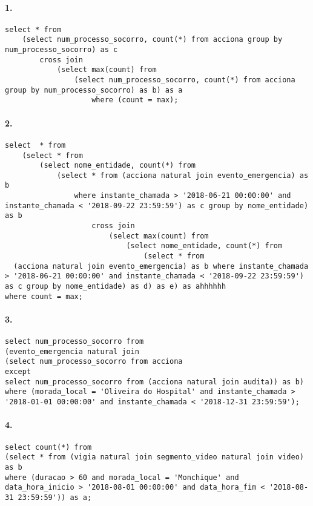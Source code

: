 \documentclass[12pt,a4paper]{article}
\begin{document}
\paragraph{1.}
\begin{verbatim}
select * from 
    (select num_processo_socorro, count(*) from acciona group by num_processo_socorro) as c 
        cross join 
            (select max(count) from 
                (select num_processo_socorro, count(*) from acciona group by num_processo_socorro) as b) as a 
                    where (count = max);
\end{verbatim}

\paragraph{2.}
\begin{verbatim}
select  * from 
    (select * from 
        (select nome_entidade, count(*) from 
            (select * from (acciona natural join evento_emergencia) as b 
                where instante_chamada > '2018-06-21 00:00:00' and instante_chamada < '2018-09-22 23:59:59') as c group by nome_entidade) as b 
                    cross join 
                        (select max(count) from 
                            (select nome_entidade, count(*) from 
                                (select * from 
  (acciona natural join evento_emergencia) as b where instante_chamada > '2018-06-21 00:00:00' and instante_chamada < '2018-09-22 23:59:59') as c group by nome_entidade) as d) as e) as ahhhhhh
where count = max;
\end{verbatim}

\paragraph{3.}
\begin{verbatim}
select num_processo_socorro from 
(evento_emergencia natural join 
(select num_processo_socorro from acciona 
except 
select num_processo_socorro from (acciona natural join audita)) as b) 
where (morada_local = 'Oliveira do Hospital' and instante_chamada > '2018-01-01 00:00:00' and instante_chamada < '2018-12-31 23:59:59');
\end{verbatim}

\paragraph{4.}
\begin{verbatim}
select count(*) from 
(select * from (vigia natural join segmento_video natural join video) as b 
where (duracao > 60 and morada_local = 'Monchique' and
data_hora_inicio > '2018-08-01 00:00:00' and data_hora_fim < '2018-08-31 23:59:59')) as a;
\end{verbatim}
\end{document}
